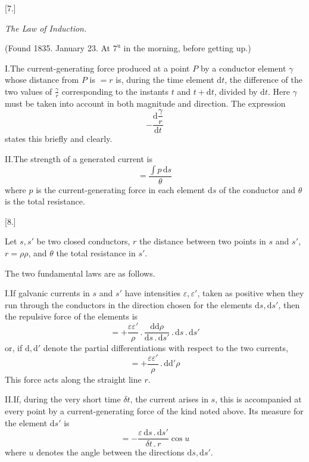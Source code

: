 \begin{center}[7.]\par\medskip\textit{The Law of Induction.}\par\medskip
{\small (Found 1835. January 23. At $7^{\mathrm u}$ in the morning, before getting up.)}
\end{center}
I.\quad The current-generating force produced at a point $P$ by a conductor element $\gamma$ whose distance from $P$ is $=r$ is, during the time element $\mathrm dt$, the difference of the two values of $\frac{\gamma}{r}$ corresponding to the instants $t$ and $t+\mathrm dt$, divided by $\mathrm dt$. Here $\gamma$ must be taken into account in both magnitude and direction. The expression
\[
-\frac{\mathrm d\dfrac{\gamma}{r}}{\mathrm dt}
\]
states this briefly and clearly.

II.\quad The strength of a generated current is
\[
=\frac{\int p\,\mathrm ds}{\theta}
\]
where $p$ is the current-generating force in each element $\mathrm ds$ of the conductor and $\theta$ is the total resistance.

\begin{center}[8.]\end{center}
Let $s,s'$ be two closed conductors, $r$ the distance between two points in $s$ and $s'$, $r=\rho\rho$, and $\theta$ the total resistance in $s'$.

The two fundamental laws are as follows.

I.\quad If galvanic currents in $s$ and $s'$ have intensities $\varepsilon,\varepsilon'$, taken as positive when they run through the conductors in the direction chosen for the elements $\mathrm ds,\mathrm ds'$, then the repulsive force of the elements is
\[
=+\frac{\varepsilon\varepsilon'}{\rho}\,.\,\frac{\mathrm d\mathrm d\rho}{\mathrm ds\,.\,\mathrm ds'}\,.\,\mathrm ds\,.\,\mathrm ds'
\]
or, if $\mathrm d,\mathrm d'$ denote the partial differentiations with respect to the two currents,
\[
=+\frac{\varepsilon\varepsilon'}{\rho}\,.\,\mathrm d\mathrm d'\rho
\]
This force acts along the straight line $r$.

\vspace{3mm}
II.\quad If, during the very short time $\delta t$, the current arises in $s$, this is accompanied at every point by a current-generating force of the kind noted above. Its measure for the element $\mathrm ds'$ is
\[
=-\frac{\varepsilon\,\mathrm ds\,.\,\mathrm ds'}{\delta t\,.\,r}\cos u
\]
where $u$ denotes the angle between the directions $\mathrm ds,\mathrm ds'$.


